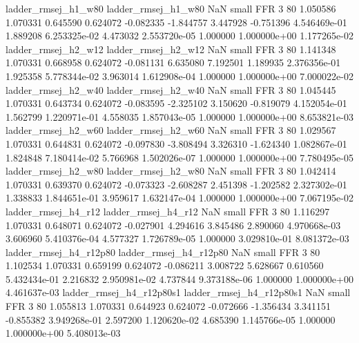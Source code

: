      ladder_rmsej_h1_w80      ladder_rmsej_h1_w80                   NaN      small      FFR                 3 80 1.050586       1.070331 0.645590       0.624072   -0.082335     -1.844757      3.447928    -0.751396   4.546469e-01  1.889208 6.253325e-02     4.473032   2.553720e-05            1.000000    1.000000e+00        1.177265e-02
     ladder_rmsej_h2_w12      ladder_rmsej_h2_w12                   NaN      small      FFR                 3 80 1.141348       1.070331 0.668958       0.624072   -0.081131      6.635080      7.192501     1.189935   2.376356e-01  1.925358 5.778344e-02     3.963014   1.612908e-04            1.000000    1.000000e+00        7.000022e-02
     ladder_rmsej_h2_w40      ladder_rmsej_h2_w40                   NaN      small      FFR                 3 80 1.045445       1.070331 0.643734       0.624072   -0.083595     -2.325102      3.150620    -0.819079   4.152054e-01  1.562799 1.220971e-01     4.558035   1.857043e-05            1.000000    1.000000e+00        8.653821e-03
     ladder_rmsej_h2_w60      ladder_rmsej_h2_w60                   NaN      small      FFR                 3 80 1.029567       1.070331 0.644831       0.624072   -0.097830     -3.808494      3.326310    -1.624340   1.082867e-01  1.824848 7.180414e-02     5.766968   1.502026e-07            1.000000    1.000000e+00        7.780495e-05
     ladder_rmsej_h2_w80      ladder_rmsej_h2_w80                   NaN      small      FFR                 3 80 1.042414       1.070331 0.639370       0.624072   -0.073323     -2.608287      2.451398    -1.202582   2.327302e-01  1.338833 1.844651e-01     3.959617   1.632147e-04            1.000000    1.000000e+00        7.067195e-02
     ladder_rmsej_h4_r12      ladder_rmsej_h4_r12                   NaN      small      FFR                 3 80 1.116297       1.070331 0.648071       0.624072   -0.027901      4.294616      3.845486     2.890060   4.970668e-03  3.606960 5.410376e-04     4.577327   1.726789e-05            1.000000    3.029810e-01        8.081372e-03
  ladder_rmsej_h4_r12p80   ladder_rmsej_h4_r12p80                   NaN      small      FFR                 3 80 1.102534       1.070331 0.659199       0.624072   -0.086211      3.008722      5.628667     0.610560   5.432434e-01  2.216832 2.950981e-02     4.737844   9.373188e-06            1.000000    1.000000e+00        4.461637e-03
ladder_rmsej_h4_r12p80s1 ladder_rmsej_h4_r12p80s1                   NaN      small      FFR                 3 80 1.055813       1.070331 0.644923       0.624072   -0.072666     -1.356434      3.341151    -0.855382   3.949268e-01  2.597200 1.120620e-02     4.685390   1.145766e-05            1.000000    1.000000e+00        5.408013e-03
